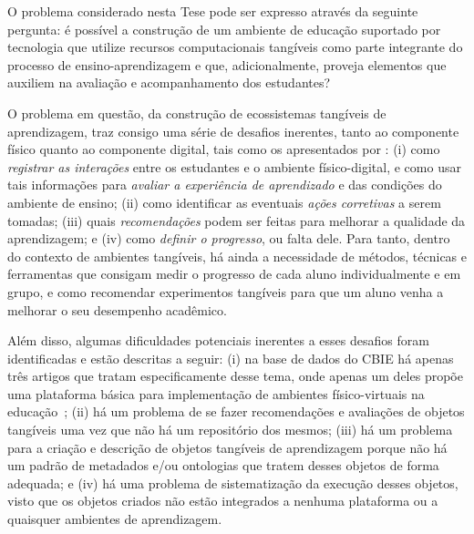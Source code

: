 O problema considerado nesta Tese pode ser expresso através da seguinte pergunta: 
é possível a construção de um ambiente de educação suportado por tecnologia que utilize recursos computacionais tangíveis como parte integrante do processo de ensino-aprendizagem e que, adicionalmente, proveja elementos que auxiliem na avaliação e acompanhamento dos estudantes?

O problema em questão, da construção de ecossistemas tangíveis de aprendizagem, traz consigo uma série de desafios inerentes, tanto ao componente físico quanto ao componente digital, tais como os apresentados por \cite{Leitao:2019}: (i) como \textit{registrar as interações} entre os estudantes e o ambiente físico-digital, e como usar tais informações para  \textit{avaliar a experiência de aprendizado} e das condições do ambiente de ensino; (ii) como identificar as eventuais  \textit{ações corretivas} a serem tomadas; (iii) quais \textit{recomendações} podem ser feitas para melhorar a qualidade da aprendizagem; e (iv) como \textit{definir o progresso}, ou falta dele.
%
Para tanto, dentro do contexto de ambientes tangíveis, há ainda a necessidade de métodos, técnicas e ferramentas que consigam medir o progresso de cada aluno individualmente e em grupo, e como recomendar experimentos tangíveis para que um aluno venha a melhorar o seu desempenho acadêmico.

Além disso, algumas dificuldades potenciais inerentes a esses desafios foram identificadas e estão descritas a seguir: (i) na base de dados do CBIE há apenas três artigos que tratam especificamente desse tema, onde apenas um deles propõe uma plataforma básica para implementação de ambientes físico-virtuais na educação~\citep{Santos:2014}; (ii) há um problema de se fazer recomendações e avaliações de objetos tangíveis uma vez que não há um repositório dos mesmos; (iii) há um problema para a criação e descrição de objetos tangíveis de aprendizagem porque não há um padrão de metadados e/ou ontologias que tratem desses objetos de forma adequada; e (iv) há uma problema de sistematização da execução desses objetos, visto que os objetos criados não estão integrados a nenhuma plataforma ou a quaisquer ambientes de aprendizagem.

